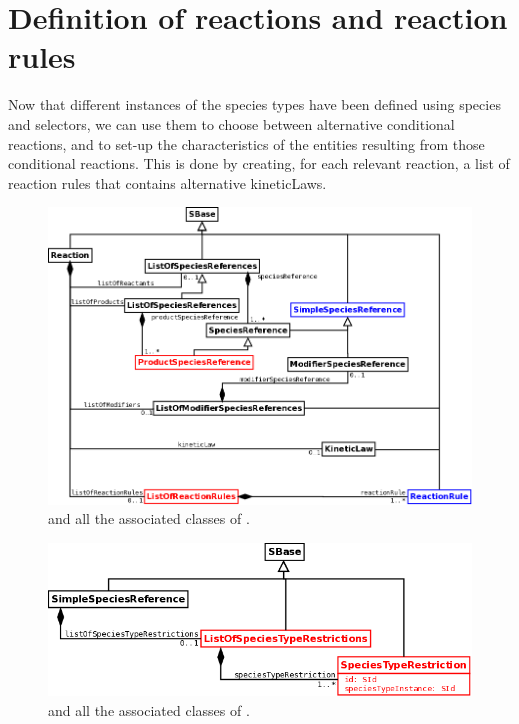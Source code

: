 \section{Definition of reactions and reaction rules}

Now that different instances of the species types have been defined using species and selectors, we can use them to choose between alternative conditional reactions, and to set-up the characteristics of the entities resulting from those conditional reactions. This is done by creating, for each relevant reaction, a list of reaction rules that contains alternative kineticLaws. 

\begin{figure}[h!]
\begin{center}
\includegraphics[scale=0.3]{./figs/pngs/ReactionGeneral.png}
\caption{ and all the associated classes of \multiVone.}
\end{center}
\end{figure}

\begin{figure}[h!]
\begin{center}
\includegraphics[scale=0.3]{./figs/pngs/SimpleSpeciesReferenceGeneral.png}
\caption{ and all the associated classes of \multiVone.}
\end{center}
\end{figure}

